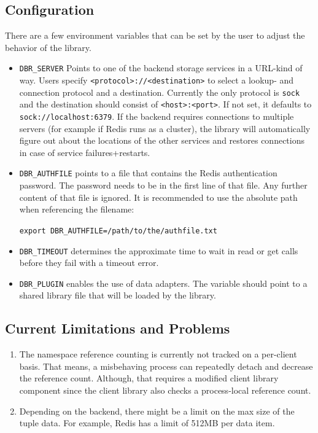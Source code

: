 \subsection{Configuration}
\label{sec:interface:config}
There are a few environment variables that can be set by the user to
adjust the behavior of the \databroker library.
\begin{itemize}
\item \texttt{DBR\_SERVER} Points to one of the backend storage
  services in a URL-kind of way. Users specify
  \texttt{<protocol>://<destination>} to select a lookup- and
  connection protocol and a destination.  Currently the only protocol
  is \texttt{sock} and the destination should consist of
  \texttt{<host>:<port>}. If not set, it defaults to
  \texttt{sock://localhost:6379}.  If the backend requires connections
  to multiple servers (for example if Redis runs as a cluster), the
  library will automatically figure out about the locations of the
  other services and restores connections in case of service
  failures+restarts.


\item \texttt{DBR\_AUTHFILE} points to a file that contains the Redis
  authentication password.  The password needs to be in the first line
  of that file. Any further content of that file is ignored. It is
  recommended to use the absolute path when referencing the filename:\\
  \centerline{ \tt export DBR\_AUTHFILE=/path/to/the/authfile.txt}

\item \texttt{DBR\_TIMEOUT} determines the approximate time to wait in
  read or get calls before they fail with a timeout error.

\item \texttt{DBR\_PLUGIN} enables the use of data adapters. The
  variable should point to a shared library file that will be loaded
  by the \databroker library.

\end{itemize}

\subsection{Current Limitations and Problems}
\label{sec:interface:limits}
\begin{enumerate}
\item The namespace reference counting is currently not tracked on a
  per-client basis. That means, a misbehaving process can repeatedly
  detach and decrease the reference count.  Although, that requires a
  modified client library component since the client library also
  checks a process-local reference count.
\item Depending on the backend, there might be a limit on the max size
  of the tuple data.  For example, Redis has a limit of 512MB per data
  item.
\end{enumerate}



